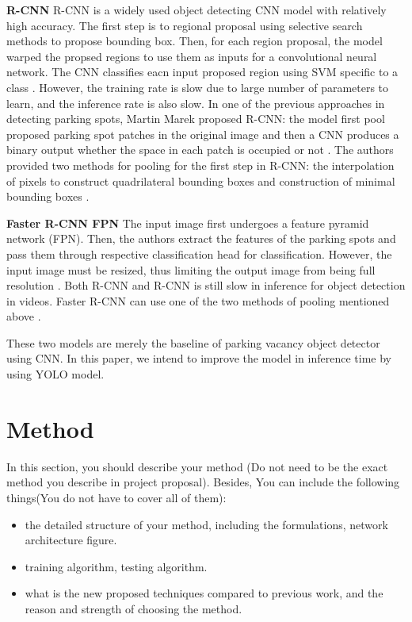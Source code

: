 \documentclass{article}
\begin{document}
\textbf{R-CNN} \quad R-CNN \cite{DBLP:journals/corr/abs-2107-12207} is a widely used object detecting CNN model with relatively high accuracy. The first step is to regional proposal using selective search methods to propose bounding box. 
Then, for each region proposal, the model warped the propsed regions to use them as inputs for a convolutional neural network. The CNN classifies eacn input proposed region using SVM specific to a class \cite{girshick2014rich}. 
However, the training rate is slow due to large number of parameters to learn, and the inference rate is also slow. In one of the previous approaches in detecting parking spots, Martin Marek proposed R-CNN: the model first pool 
proposed parking spot patches in the original image and then a CNN produces a binary output whether the space in each patch is occupied or not \cite{DBLP:journals/corr/abs-2107-12207}. The authors provided two methods for pooling
for the first step in R-CNN: the interpolation of pixels to construct quadrilateral bounding boxes and construction of minimal bounding boxes \cite{DBLP:journals/corr/abs-2107-12207}. 

\textbf{Faster R-CNN FPN} The input image first undergoes a feature pyramid network (FPN). Then, the authors extract the features of the parking spots and pass them through respective classification head for classification. However, 
the input image must be resized, thus limiting the output image from being full resolution \cite{DBLP:journals/corr/abs-2107-12207}. Both R-CNN and R-CNN is still slow in inference for object detection in videos. Faster R-CNN can use
one of the two methods of pooling mentioned above \cite{DBLP:journals/corr/abs-2107-12207}. 

These two models are merely the baseline of parking vacancy object detector using CNN. In this paper, we intend to improve the model in inference time by using YOLO model. 

\section{Method}

In this section, you should describe your method (Do not need to be the exact method you describe in project proposal). Besides, You can include the following things(You do not have to cover all of them): 

\begin{itemize}
    \item the detailed structure of your method, including the formulations, network architecture figure.
    \item training algorithm, testing algorithm.
    \item what is the new proposed techniques compared to previous work, and the reason and strength of choosing the method.
\end{itemize}
\end{document}
